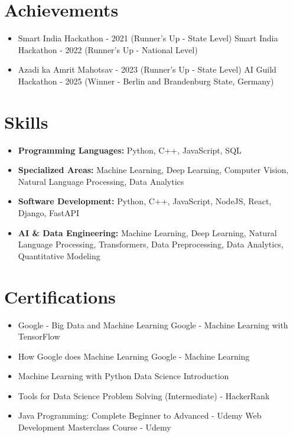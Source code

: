 \documentclass[a4paper,10pt]{article}
\begin{document}
\section*{Achievements}
\begin{itemize}
\item Smart India Hackathon - 2021 (Runner's Up - State Level) \hfill Smart India Hackathon - 2022 (Runner's Up - National Level)
\item Azadi ka Amrit Mahotsav - 2023 (Runner's Up - State Level) \hfill AI Guild Hackathon - 2025 (Winner - Berlin and Brandenburg State, Germany)
\end{itemize}

\section*{Skills}
\begin{itemize}
  \item \textbf{Programming Languages:} Python, C++, JavaScript, SQL
  \item \textbf{Specialized Areas:} Machine Learning, Deep Learning, Computer Vision, Natural Language Processing, Data Analytics
  \item \textbf{Software Development:} Python, C++, JavaScript, NodeJS, React, Django, FastAPI
  \item \textbf{AI \& Data Engineering:} Machine Learning, Deep Learning, Natural Language Processing, Transformers, Data Preprocessing, Data Analytics, Quantitative Modeling
\end{itemize}

\section*{Certifications}
\begin{itemize}
\item Google - Big Data and Machine Learning \hfill Google - Machine Learning with TensorFlow
\item How Google does Machine Learning \hfill Google - Machine Learning
\item Machine Learning with Python \hfill Data Science Introduction
\item Tools for Data Science \hfill Problem Solving (Intermediate) - HackerRank
\item Java Programming: Complete Beginner to Advanced - Udemy \hfill Web Development Masterclass Course - Udemy
\end{itemize}
\end{document}
